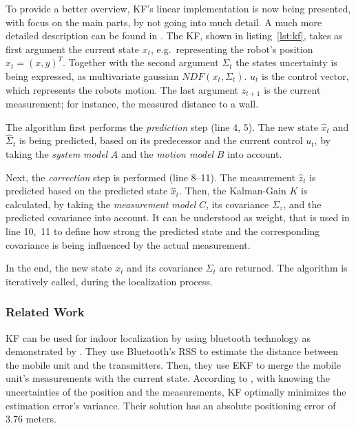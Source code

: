 
To provide a better overview, \ac{KF}'s linear implementation is now being presented, with focus on the main parts, by not going into much detail. A much more detailed description can be found in \citet{thrun:prob_robo}. 
The \ac{KF}, shown in listing~\ref{lst:kf}, takes as first argument the current state $x_t$, e.g.\ representing the robot's position $x_t = (x, y)^T$. Together with the second argument $\Sigma_t$ the states uncertainty is being expressed, as multivariate gaussian $NDF(x_t, \Sigma_t)$. $u_t$ is the control vector, which represents the robots motion. The last argument $z_{t+1}$ is the current measurement; for instance, the measured distance to a wall.

The algorithm first performs the \emph{prediction} step (line 4, 5). The new state $\hat{x}_t$ and $\hat{\Sigma}_t$ is being predicted, based on its predecessor and the current control $u_t$, by taking the \emph{system model} $A$ and the \emph{motion model} $B$ into account.

Next, the \emph{correction} step is performed (line 8--11). The measurement $\hat{z}_t$ is predicted based on the predicted state $\hat{x}_t$. Then, the Kalman-Gain $K$ is calculated, by taking the \emph{measurement model} $C$, its covariance $\Sigma_z$, and the predicted covariance into account. It can be understood as weight, that is used in line 10,~11 to define how strong the predicted  state and the corresponding covariance is being influenced by the actual measurement.

In the end, the new state $x_t$ and its covariance $\Sigma_t$ are returned. The algorithm is iteratively called, during the localization process.

\subsubsection*{Related Work}
\ac{KF} can be used for indoor localization by using bluetooth technology as demonstrated by \citet{kotanen:exp_local_pos_bt}. They use Bluetooth's \ac{RSS} to estimate the distance between the mobile unit and the transmitters. Then, they use \acl{EKF} to merge the mobile unit's measurements with the current state. According to \cite{kotanen:exp_local_pos_bt}, with knowing the uncertainties of the position and the measurements, \ac{KF} optimally minimizes the estimation error's variance. Their solution has an absolute positioning error of 3.76 meters.


